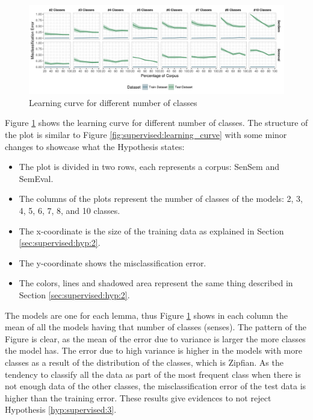 \begin{figure}[ht]
	\includegraphics[width=\textwidth]{plots/supervised/learning_curve_per_class_num}
  \caption{Learning curve for different number of classes}
  \label{fig:supervised:learning_curve_per_class_num}
\end{figure}

Figure \ref{fig:supervised:learning_curve_per_class_num} shows the learning
curve for different number of classes. The structure of the plot is similar to
Figure \ref{fig:supervised:learning_curve} with some minor changes to showcase
what the Hypothesis states:

\begin{itemize}
  \item The plot is divided in two rows, each represents a corpus: SenSem and
    SemEval.
  \item The columns of the plots represent the number of classes of the
    models: 2, 3, 4, 5, 6, 7, 8, and 10 classes.
  \item The x-coordinate is the size of the training data as explained in
    Section \ref{sec:supervised:hyp:2}.
  \item The y-coordinate shows the misclassification error.
  \item The colors, lines and shadowed area represent the same thing described
    in Section \ref{sec:supervised:hyp:2}.
\end{itemize}

The models are one for each lemma, thus Figure
\ref{fig:supervised:learning_curve_per_class_num} shows in each column the mean
of all the models having that number of classes (senses). The pattern of the
Figure is clear, as the mean of the error due to variance is larger the more
classes the model has. The error due to high variance is higher in the models
with more classes as a result of the distribution of the classes, which is
Zipfian. As the tendency to classify all the data as part of the most frequent
class when there is not enough data of the other classes, the misclassification
error of the test data is higher than the training error. These results give
evidences to not reject Hypothesis \ref{hyp:supervised:3}.

